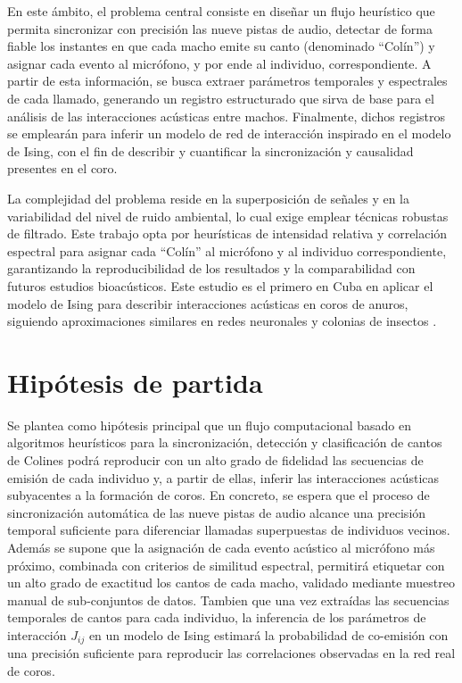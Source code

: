 En este ámbito, el problema central consiste en diseñar un flujo 
heurístico que permita sincronizar con precisión las 
nueve pistas de audio, detectar de forma fiable los instantes en 
que cada macho emite su canto (denominado “Colín”) y asignar 
cada evento al micrófono, y por ende al individuo, 
correspondiente. A partir de esta información, se busca extraer 
parámetros temporales y espectrales de cada llamado, generando 
un registro estructurado que sirva de base para el análisis de 
las interacciones acústicas entre machos. Finalmente, dichos 
registros se emplearán para inferir un modelo de red de 
interacción inspirado en el modelo de Ising, con el fin de 
describir y cuantificar la sincronización y causalidad presentes 
en el coro.

La complejidad del problema reside en la superposición de 
señales y en la variabilidad del nivel de ruido ambiental, lo 
cual exige emplear técnicas robustas de filtrado. 
Este trabajo opta por heurísticas 
de intensidad relativa y correlación espectral para asignar cada “Colín” al micrófono y 
al individuo correspondiente, garantizando 
la reproducibilidad de los resultados y la comparabilidad con 
futuros estudios bioacústicos. Este estudio es el primero en 
Cuba en aplicar el modelo de Ising para describir 
interacciones acústicas en coros de anuros, siguiendo 
aproximaciones similares en redes 
neuronales y colonias de insectos \cite{schneidman2006weak,mora2011biological,bialek2012biophysics,reyes2019transmission}.

\section{Hipótesis de partida}
\label{sec:hipotesis}

Se plantea como hipótesis principal que un flujo computacional 
basado en algoritmos heurísticos para la sincronización, 
detección y clasificación de cantos de Colines podrá reproducir con un alto 
grado de fidelidad las secuencias de emisión de cada individuo 
y, a partir de ellas, inferir las interacciones acústicas 
subyacentes a la formación de coros. En concreto, se espera 
que el proceso de sincronización automática de las nueve 
pistas de audio alcance una precisión temporal suficiente para 
diferenciar llamadas superpuestas de individuos vecinos. 
Además se supone que la asignación de cada evento acústico al 
micrófono más próximo, combinada con criterios de similitud 
espectral, permitirá etiquetar con un alto grado de 
exactitud los cantos de cada macho, validado mediante muestreo 
manual de sub-conjuntos de datos. 
Tambien que una vez extraídas las secuencias temporales de cantos para 
cada individuo, la inferencia de los parámetros de interacción 
\(J_{ij}\) en un modelo de Ising estimará la probabilidad de 
co-emisión con una precisión suficiente para reproducir las 
correlaciones observadas en la red real de coros.  


